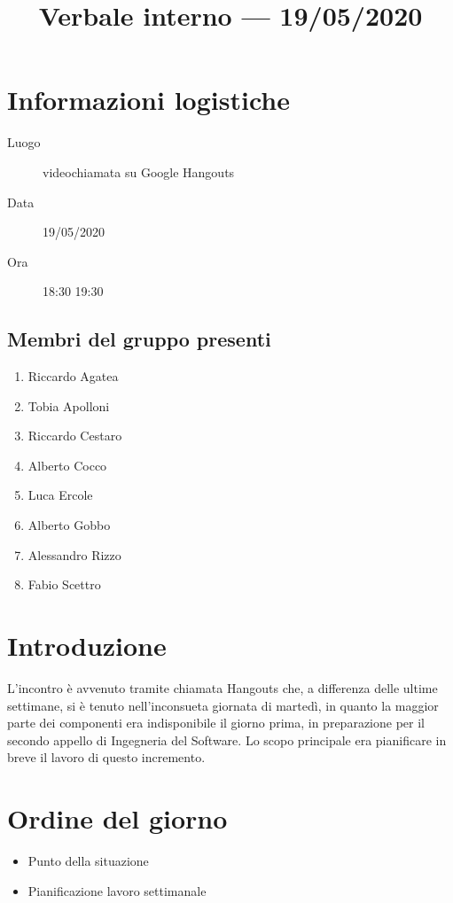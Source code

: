 \documentclass{article}
\title{Verbale interno --- 19/05/2020}
\begin{document}


\section{Informazioni logistiche}%
\label{sec:informazioni_logistiche}

\begin{description}
  \item [Luogo] videochiamata su Google Hangouts
  \item [Data] 19/05/2020
  \item [Ora] 18:30  19:30
\end{description}

\subsection{Membri del gruppo presenti}%
\label{sub:membri_del_gruppo_presenti}

\begin{enumerate}
  \item Riccardo Agatea
  \item Tobia Apolloni
  \item Riccardo Cestaro
  \item Alberto Cocco
  \item Luca Ercole
  \item Alberto Gobbo
  \item Alessandro Rizzo
  \item Fabio Scettro
\end{enumerate}

\section{Introduzione}%
\label{sec:introduzione}
L'incontro è avvenuto tramite chiamata Hangouts che, a differenza delle ultime settimane, si è tenuto nell'inconsueta giornata di martedì, in quanto la maggior parte dei componenti era indisponibile il giorno prima, in preparazione per il secondo appello di Ingegneria del Software.
Lo scopo principale era pianificare in breve il lavoro di questo incremento.

\section{Ordine del giorno}%
\label{sec:ordine_del_giorno}

\begin{itemize}
  \item Punto della situazione
  \item Pianificazione lavoro settimanale
\end{itemize}
\end{document}
